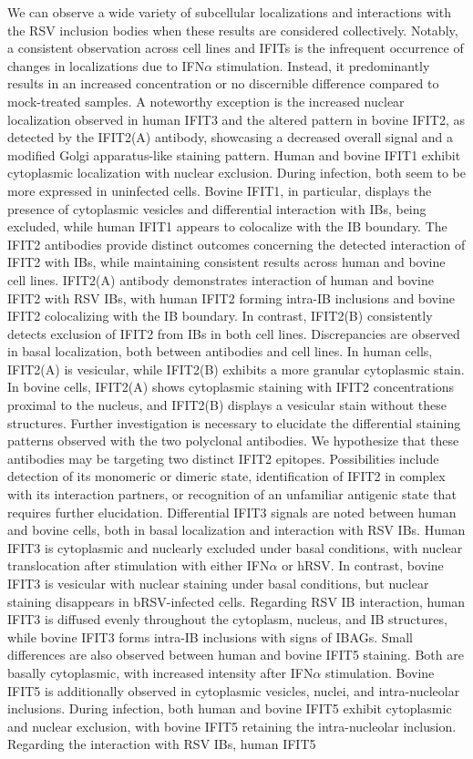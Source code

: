We can observe a wide variety of subcellular localizations and interactions with the RSV inclusion bodies when these results are considered collectively. Notably, a consistent observation across cell lines and IFITs is the infrequent occurrence of changes in localizations due to IFN\(\alpha\) stimulation. Instead, it predominantly results in an increased concentration or no discernible difference compared to mock-treated samples. A noteworthy exception is the increased nuclear localization observed in human IFIT3 and the altered pattern in bovine IFIT2, as detected by the IFIT2(A) antibody, showcasing a decreased overall signal and a modified Golgi apparatus-like staining pattern. Human and bovine IFIT1 exhibit cytoplasmic localization with nuclear exclusion. During infection, both seem to be more expressed in uninfected cells. Bovine IFIT1, in particular, displays the presence of cytoplasmic vesicles and differential interaction with IBs, being excluded, while human IFIT1 appears to colocalize with the IB boundary. The IFIT2 antibodies provide distinct outcomes concerning the detected interaction of IFIT2 with IBs, while maintaining consistent results across human and bovine cell lines. IFIT2(A) antibody demonstrates interaction of human and bovine IFIT2 with RSV IBs, with human IFIT2 forming intra-IB inclusions and bovine IFIT2 colocalizing with the IB boundary. In contrast, IFIT2(B) consistently detects exclusion of IFIT2 from IBs in both cell lines. Discrepancies are observed in basal localization, both between antibodies and cell lines. In human cells, IFIT2(A) is vesicular, while IFIT2(B) exhibits a more granular cytoplasmic stain. In bovine cells, IFIT2(A) shows cytoplasmic staining with IFIT2 concentrations proximal to the nucleus, and IFIT2(B) displays a vesicular stain without these structures. Further investigation is necessary to elucidate the differential staining patterns observed with the two polyclonal antibodies. We hypothesize that these antibodies may be targeting two distinct IFIT2 epitopes. Possibilities include detection of its monomeric or dimeric state, identification of IFIT2 in complex with its interaction partners, or recognition of an unfamiliar antigenic state that requires further elucidation. Differential IFIT3 signals are noted between human and bovine cells, both in basal localization and interaction with RSV IBs. Human IFIT3 is cytoplasmic and nuclearly excluded under basal conditions, with nuclear translocation after stimulation with either IFN\(\alpha\) or hRSV. In contrast, bovine IFIT3 is vesicular with nuclear staining under basal conditions, but nuclear staining disappears in bRSV-infected cells. Regarding RSV IB interaction, human IFIT3 is diffused evenly throughout the cytoplasm, nucleus, and IB structures, while bovine IFIT3 forms intra-IB inclusions with signs of IBAGs. Small differences are also observed between human and bovine IFIT5 staining. Both are basally cytoplasmic, with increased intensity after IFN\(\alpha\) stimulation. Bovine IFIT5 is additionally observed in cytoplasmic vesicles, nuclei, and intra-nucleolar inclusions. During infection, both human and bovine IFIT5 exhibit cytoplasmic and nuclear exclusion, with bovine IFIT5 retaining the intra-nucleolar inclusion. Regarding the interaction with RSV IBs, human IFIT5 